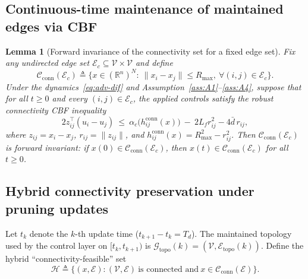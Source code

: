 \documentclass[conference]{IEEEconf}
\theoremstyle{plain}
\newtheorem{lemma}{Lemma}     %
\begin{document}
\subsection{Continuous-time maintenance of maintained edges via CBF}
\label{subsec:cbf_link_invariance}

\begin{lemma}[Forward invariance of the connectivity set for a fixed edge set]
\label{lem:cbf_conn_invariance}
Fix any undirected edge set $\mathcal{E}_c\subseteq \mathcal{V}\times\mathcal{V}$ and define
\[
\mathcal{C}_{\mathrm{conn}}(\mathcal{E}_c)
\triangleq
\Big\{x\in(\mathbb{R}^n)^N:\ \|x_i-x_j\|\le R_{\max},\ \forall (i,j)\in\mathcal{E}_c\Big\}.
\]
Under the dynamics~\eqref{eq:adv-dif} and Assumption~\ref{ass:A1}--\ref{ass:A4}, suppose that for all $t\ge 0$ and every
$(i,j)\in\mathcal{E}_c$, the applied controls satisfy the robust connectivity CBF inequality
\begin{equation}
2 z_{ij}^\top (u_i-u_j)\ \le\ \alpha_c\!\big(h^{\mathrm{conn}}_{ij}(x)\big)\ -\ 2L_f r_{ij}^2 - 4\bar d\, r_{ij},
\label{eq:robust_conn_cbf_recall}
\end{equation}
where $z_{ij}=x_i-x_j$, $r_{ij}=\|z_{ij}\|$, and $h^{\mathrm{conn}}_{ij}(x)=R_{\max}^2-r_{ij}^2$.
Then $\mathcal{C}_{\mathrm{conn}}(\mathcal{E}_c)$ is forward invariant: if
$x(0)\in\mathcal{C}_{\mathrm{conn}}(\mathcal{E}_c)$, then $x(t)\in\mathcal{C}_{\mathrm{conn}}(\mathcal{E}_c)$ for all $t\ge 0$.
\end{lemma}

\subsection{Hybrid connectivity preservation under pruning updates}
\label{subsec:hybrid_connectivity}

Let $t_k$ denote the $k$-th update time ($t_{k+1}-t_k=T_d$). The maintained topology used by the control layer on
$[t_k,t_{k+1})$ is $\mathcal{G}_{\mathrm{topo}}(k)=(\mathcal{V},\mathcal{E}_{\mathrm{topo}}(k))$.
Define the hybrid ``connectivity-feasible'' set
\begin{equation}
\mathcal{H}
\triangleq
\Big\{(x,\mathcal{E}) : (\mathcal{V},\mathcal{E})\ \text{is connected and}\ x\in\mathcal{C}_{\mathrm{conn}}(\mathcal{E}) \Big\}.
\label{eq:hybrid_set_H}
\end{equation}
\end{document}
